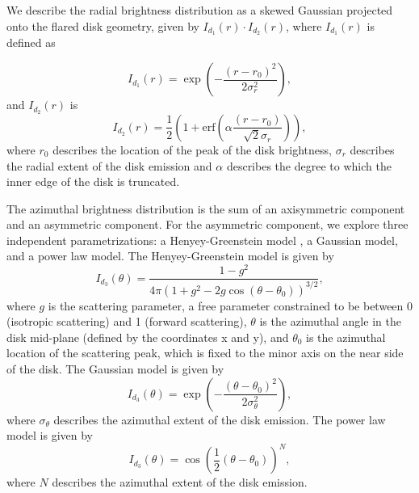 \documentclass[11pt,twocolumn,twocolappendix]{aastex631}
\begin{document}
\noindent We describe the radial brightness distribution as a skewed Gaussian projected onto the flared disk geometry, given by $I_{d_1}(r) \cdot I_{d_2}(r)$, where $I_{d_1}(r)$ is defined as

\begin{equation}
\label{eqn:odradial}
    I_{d_1}(r) = \exp\left(-\frac{(r-r_0)^2}{2\sigma_r^2}\right),
\end{equation}
and $I_{d_2}(r)$ is
\begin{equation}
\label{eqn:odskew}
    I_{d_2}(r) = \frac{1}{2} \left(1 + \mathrm{erf}\left(\alpha \frac{(r-r_0)}{\sqrt{2}\sigma_r} \right)\right),
\end{equation}
where $r_0$ describes the location of the peak of the disk brightness, $\sigma_r$ describes the radial extent of the disk emission and $\alpha$ describes the degree to which the inner edge of the disk is truncated.

The azimuthal brightness distribution is {the sum of an axisymmetric component and an asymmetric component. For the asymmetric component, we explore three independent parametrizations: a Henyey-Greenstein model \citep{1941ApJ....93...70H}, a Gaussian model, and a power law model. The Henyey-Greenstein model is given by
\begin{equation}
\label{eqn:odazimuthal}
    I_{d_3}(\theta) = \frac{1-g^2}{4 \pi (1 + g^2 -2 g \cos(\theta - \theta_0))^{3/2}},
\end{equation}
where $g$ is the scattering parameter, a free parameter constrained to be between 0 (isotropic scattering) and 1 (forward scattering), $\theta$ is the azimuthal angle in the disk mid-plane (defined by the coordinates x and y), and $\theta_0$ is the azimuthal location of the scattering peak, which is fixed to the minor axis on the near side of the disk. The Gaussian model is given by 
\begin{equation}
\label{eqn:odazimuthal_Gaussian}
    I_{d_3}(\theta) = \exp\left(-\frac{(\theta-\theta_0)^2}{2\sigma_{\theta}^2}\right),
\end{equation}
where $\sigma_{\theta}$ describes the azimuthal extent of the disk emission. The power law model is given by
\begin{equation}
\label{eqn:odazimuthal_powerlaw}
    I_{d_3}(\theta) = \cos\left( \frac{1}{2}(\theta-\theta_0)\right)^N,
\end{equation}
where $N$ describes the azimuthal extent of the disk emission.}

\end{document}
